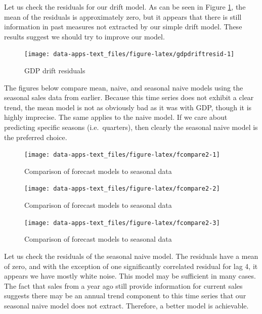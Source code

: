 \documentclass[
]{book}
\begin{document}
Let us check the residuals for our drift model. As can be seen in Figure \ref{fig:gdpdriftresid}, the mean of the residuals is approximately zero, but it appears that there is still information in past measures not extracted by our simple drift model. These results suggest we should try to improve our model.

\begin{figure}

{\centering \texttt{[image: data-apps-text\_files/figure-latex/gdpdriftresid-1]} 

}

\caption{GDP drift residuals}\label{fig:gdpdriftresid}
\end{figure}

The figures below compare mean, naive, and seasonal naive models using the seasonal sales data from earlier. Because this time series does not exhibit a clear trend, the mean model is not as obviously bad as it was with GDP, though it is highly imprecise. The same applies to the naive model. If we care about predicting specific seasons (i.e.~quarters), then clearly the seasonal naive model is the preferred choice.

\begin{figure}

{\centering \texttt{[image: data-apps-text\_files/figure-latex/fcompare2-1]} 

}

\caption{Comparison of forecast models to seasonal data}\label{fig:fcompare2-1}
\end{figure}
\begin{figure}

{\centering \texttt{[image: data-apps-text\_files/figure-latex/fcompare2-2]} 

}

\caption{Comparison of forecast models to seasonal data}\label{fig:fcompare2-2}
\end{figure}
\begin{figure}

{\centering \texttt{[image: data-apps-text\_files/figure-latex/fcompare2-3]} 

}

\caption{Comparison of forecast models to seasonal data}\label{fig:fcompare2-3}
\end{figure}

Let us check the residuals of the seasonal naive model. The residuals have a mean of zero, and with the exception of one significantly correlated residual for lag 4, it appears we have mostly white noise. This model may be sufficient in many cases. The fact that sales from a year ago still provide information for current sales suggests there may be an annual trend component to this time series that our seasonal naive model does not extract. Therefore, a better model is achievable.
\end{document}
